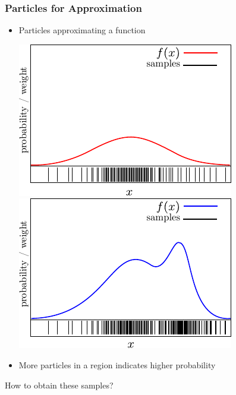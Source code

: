 \begin{frame}
    \frametitle{Particles for Approximation}
    
    \begin{itemize}
        \item Particles approximating a function
        
        \begin{center}
            \includegraphics[width=0.45\columnwidth]{./images/particle_filter/gaussian_approximation_by_sampling.pdf}
            \includegraphics[width=0.45\columnwidth]{./images/particle_filter/particles_for_approximation.pdf}
        \end{center}

        \item More particles in a region indicates higher probability
    \end{itemize}
    
    \begin{center}
        \alert{How to obtain these samples?}
    \end{center}

\end{frame}

